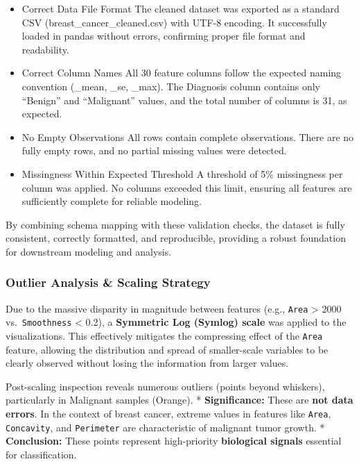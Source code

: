 \documentclass[
  letterpaper,
  DIV=11,
  numbers=noendperiod]{scrartcl}
\begin{document}
\begin{itemize}
\item
  Correct Data File Format The cleaned dataset was exported as a
  standard CSV (breast\_cancer\_cleaned.csv) with UTF-8 encoding. It
  successfully loaded in pandas without errors, confirming proper file
  format and readability.
\item
  Correct Column Names All 30 feature columns follow the expected naming
  convention (\_mean, \_se, \_max). The Diagnosis column contains only
  ``Benign'' and ``Malignant'' values, and the total number of columns
  is 31, as expected.
\item
  No Empty Observations All rows contain complete observations. There
  are no fully empty rows, and no partial missing values were detected.
\item
  Missingness Within Expected Threshold A threshold of 5\% missingness
  per column was applied. No columns exceeded this limit, ensuring all
  features are sufficiently complete for reliable modeling.
\end{itemize}

By combining schema mapping with these validation checks, the dataset is
fully consistent, correctly formatted, and reproducible, providing a
robust foundation for downstream modeling and analysis.

\subsubsection{Outlier Analysis \& Scaling
Strategy}\label{outlier-analysis-scaling-strategy}

Due to the massive disparity in magnitude between features (e.g.,
\texttt{Area} \textgreater{} 2000 vs.~\texttt{Smoothness} \textless{}
0.2), a \textbf{Symmetric Log (Symlog) scale} was applied to the
visualizations. This effectively mitigates the compressing effect of the
\texttt{Area} feature, allowing the distribution and spread of
smaller-scale variables to be clearly observed without losing the
information from larger values.

Post-scaling inspection reveals numerous outliers (points beyond
whiskers), particularly in Malignant samples (Orange). *
\textbf{Significance:} These are \textbf{not data errors}. In the
context of breast cancer, extreme values in features like \texttt{Area},
\texttt{Concavity}, and \texttt{Perimeter} are characteristic of
malignant tumor growth. * \textbf{Conclusion:} These points represent
high-priority \textbf{biological signals} essential for classification.
\end{document}
